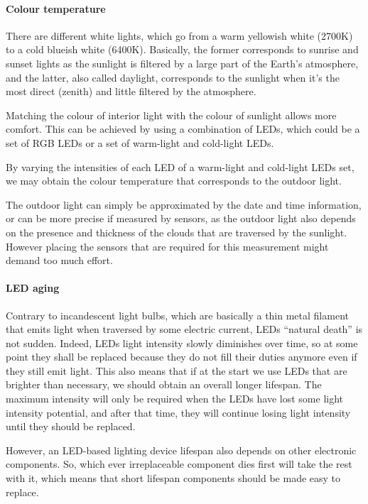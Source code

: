\documentclass[12pt,twoside,a4paper]{article}
\begin{document}
\paragraph{Colour temperature}

There are different white lights, which go from a warm yellowish white
(2700K)  to  a cold  blueish  white  (6400K).  Basically,  the  former
corresponds to sunrise  and sunset lights as the  sunlight is filtered
by a large part of the Earth's atmosphere, and the latter, also called
daylight,  corresponds  to the  sunlight  when  it's the  most  direct
(zenith) and little filtered by the atmosphere.

Matching  the colour  of interior  light with  the colour  of sunlight
allows more  comfort. This can be  achieved by using  a combination of
LEDs, which  could be a  set of  RGB LEDs or  a set of  warm-light and
cold-light LEDs.

By varying the intensities of each  LED of a warm-light and cold-light
LEDs set, we may obtain the colour temperature that corresponds to the
outdoor light.

The outdoor  light can  simply be  approximated by  the date  and time
information, or  can be more  precise if  measured by sensors,  as the
outdoor light also depends on the presence and thickness of the clouds
that are traversed by the  sunlight.  However placing the sensors that
are required for this measurement might demand too much effort.

\paragraph{LED aging}

Contrary to incandescent light bulbs, which are basically a thin metal
filament  that emits light  when traversed  by some  electric current,
LEDs “natural death” is not sudden. Indeed, LEDs light intensity slowly
diminishes over time, so at  some point they shall be replaced because
they do not  fill their duties anymore even if  they still emit light.
This also  means that if  at the start  we use LEDs that  are brighter
than  necessary, we  should obtain  an overall  longer  lifespan.  The
maximum intensity will  only be required when the  LEDs have lost some
light  intensity potential, and  after that  time, they  will continue
losing light intensity until they should be replaced.

However, an  LED-based lighting device lifespan also  depends on other
electronic  components.  So, which  ever irreplaceable  component dies
first  will take the  rest with  it, which  means that  short lifespan
components should be made easy to replace.
\end{document}
